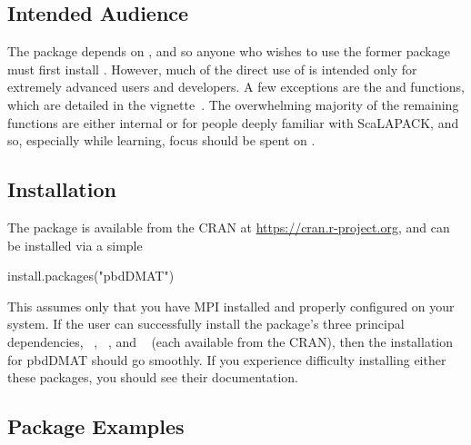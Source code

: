 \subsection{Intended Audience}
\label{sec:more_examples}

The  package depends on , and so anyone who wishes to use the former package must first install .  However, much of the direct use of  is intended only for extremely advanced users and developers.  A few exceptions are the  and  functions, which are detailed in the  vignette~\citep{Schmidt2012pbdBASEvignette}.  The overwhelming majority of the remaining functions are either internal or for people deeply familiar with ScaLAPACK, and so, especially while learning, focus should be spent on .






\subsection{Installation}
\label{sec:installation}

The  package is available from the CRAN at
\url{https://cran.r-project.org}, and can be installed via a simple 
\begin{Code}
install.packages("pbdDMAT")
\end{Code}
This assumes only that you have MPI installed and properly configured on your system.  If the user can successfully install the package's three principal dependencies, ~\citep{Chen2012pbdMPIpackage}, ~\citep{Chen2012pbdSLAPpackage}, and ~\citep{Schmidt2012pbdBASEpackage} (each available from the CRAN), then the installation for pbdDMAT should go smoothly.  If you experience difficulty installing either these packages, you should see their documentation.






\subsection{Package Examples}
\label{sec:more_examples}

